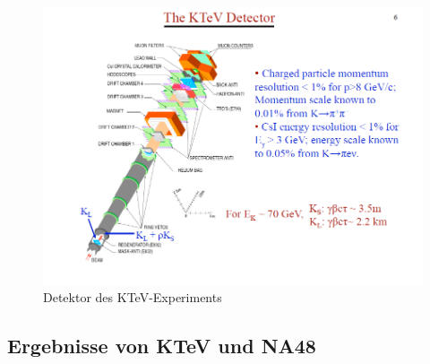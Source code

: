 \documentclass[aspectratio=1610, professionalfonts, 9pt, t]{beamer}
\begin{document}
  \begin{frame}
    \begin{figure}[ht]
      \includegraphics[height=0.8\textheight]{Images/KTEVDETEKTOR.png}
      \caption{Detektor des KTeV-Experiments}
    \end{figure}
  \end{frame}

  \subsection{Ergebnisse von KTeV und NA48}

\end{document}
